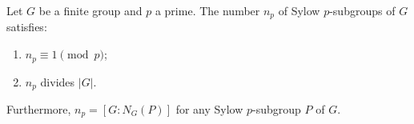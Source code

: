 Let $G$ be a finite group and $p$ a prime. The number $n_p$ of Sylow $p$-subgroups of $G$ satisfies:
\begin{enumerate}
\item $n_p \equiv 1 \pmod{p}$;
\item $n_p$ divides $|G|$.
\end{enumerate}
Furthermore, $n_p = [G : N_G(P)]$ for any Sylow $p$-subgroup $P$ of $G$.
